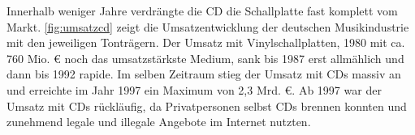 Innerhalb weniger Jahre verdrängte die CD die Schallplatte fast komplett vom
Markt. \autoref{fig:umsatzcd} zeigt die Umsatzentwicklung der deutschen
Musikindustrie mit den jeweiligen Tonträgern. Der Umsatz mit Vinylschallplatten,
1980 mit ca. 760 Mio. \euro{} noch das umsatzstärkste Medium, sank bis 1987 erst
all­mäh­lich und dann bis 1992 rapide. Im selben Zeitraum stieg der Umsatz mit
CDs massiv an und erreichte im Jahr 1997 ein Maximum von 2,3 Mrd. \euro{}. Ab
1997 war der Umsatz mit CDs rückläufig, da Privatpersonen selbst CDs \glqq
brennen\grqq{} konnten und zunehmend legale und illegale Angebote im Internet
nutzten.

